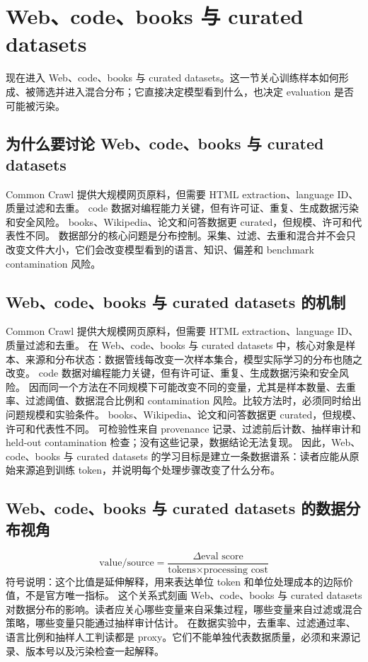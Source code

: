 \documentclass[a4paper]{article}
\begin{document}
\section{Web、code、books 与 curated datasets}
现在进入 Web、code、books 与 curated datasets。这一节关心训练样本如何形成、被筛选并进入混合分布；它直接决定模型看到什么，也决定 evaluation 是否可能被污染。
\subsection{为什么要讨论 Web、code、books 与 curated datasets}
Common Crawl 提供大规模网页原料，但需要 HTML extraction、language ID、质量过滤和去重。
code 数据对编程能力关键，但有许可证、重复、生成数据污染和安全风险。
books、Wikipedia、论文和问答数据更 curated，但规模、许可和代表性不同。
数据部分的核心问题是分布控制。采集、过滤、去重和混合并不会只改变文件大小，它们会改变模型看到的语言、知识、偏差和 benchmark contamination 风险。
\subsection{Web、code、books 与 curated datasets 的机制}
Common Crawl 提供大规模网页原料，但需要 HTML extraction、language ID、质量过滤和去重。 在 Web、code、books 与 curated datasets 中，核心对象是样本、来源和分布状态：数据管线每改变一次样本集合，模型实际学习的分布也随之改变。
code 数据对编程能力关键，但有许可证、重复、生成数据污染和安全风险。 因而同一个方法在不同规模下可能改变不同的变量，尤其是样本数量、去重率、过滤阈值、数据混合比例和 contamination 风险。比较方法时，必须同时给出问题规模和实验条件。
books、Wikipedia、论文和问答数据更 curated，但规模、许可和代表性不同。 可检验性来自 provenance 记录、过滤前后计数、抽样审计和 held-out contamination 检查；没有这些记录，数据结论无法复现。
因此，Web、code、books 与 curated datasets 的学习目标是建立一条数据谱系：读者应能从原始来源追到训练 token，并说明每个处理步骤改变了什么分布。
\subsection{Web、code、books 与 curated datasets 的数据分布视角}
\[\text{value/source}=\frac{\Delta \text{eval score}}{\text{tokens}\times\text{processing cost}}\]
符号说明：这个比值是延伸解释，用来表达单位 token 和单位处理成本的边际价值，不是官方唯一指标。
这个关系式刻画 Web、code、books 与 curated datasets 对数据分布的影响。读者应关心哪些变量来自采集过程，哪些变量来自过滤或混合策略，哪些变量只能通过抽样审计估计。
在数据实验中，去重率、过滤通过率、语言比例和抽样人工判读都是 proxy。它们不能单独代表数据质量，必须和来源记录、版本号以及污染检查一起解释。
\end{document}
